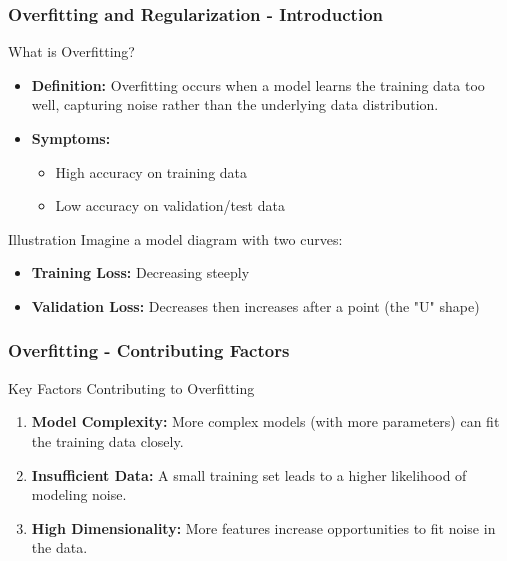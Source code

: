 \documentclass[aspectratio=169]{beamer}
\begin{document}
\begin{frame}[fragile]
    \frametitle{Overfitting and Regularization - Introduction}
    \begin{block}{What is Overfitting?}
        \begin{itemize}
            \item \textbf{Definition:} Overfitting occurs when a model learns the training data too well, capturing noise rather than the underlying data distribution.
            \item \textbf{Symptoms:}
                \begin{itemize}
                    \item High accuracy on training data
                    \item Low accuracy on validation/test data
                \end{itemize}
        \end{itemize}
    \end{block}
    \begin{block}{Illustration}
        Imagine a model diagram with two curves:
        \begin{itemize}
            \item \textbf{Training Loss:} Decreasing steeply
            \item \textbf{Validation Loss:} Decreases then increases after a point (the "U" shape)
        \end{itemize}
    \end{block}
\end{frame}

\begin{frame}[fragile]
    \frametitle{Overfitting - Contributing Factors}
    \begin{block}{Key Factors Contributing to Overfitting}
        \begin{enumerate}
            \item \textbf{Model Complexity:} More complex models (with more parameters) can fit the training data closely.
            \item \textbf{Insufficient Data:} A small training set leads to a higher likelihood of modeling noise.
            \item \textbf{High Dimensionality:} More features increase opportunities to fit noise in the data.
        \end{enumerate}
    \end{block}
\end{frame}
\end{document}
